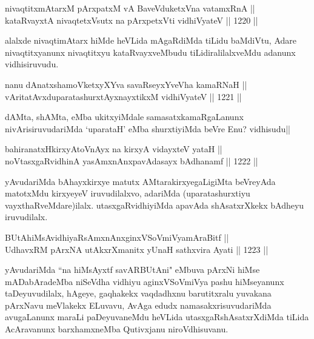\begin{shl}
nivaqtitxmAtarxM pArxpatxM vA BaveVduketxVna vatamxRnA || \\
kataRvayxtA nivaqtetxVsutx na pArxpetxVti vidhiVyateV ||  1220 ||  
\end{shl}

\begin{artha}
alalxde nivaqtimAtarx hiMde heVLida mAgaRdiMda tiLidu baMdiVtu, Adare nivaqtitxyanunx nivaqtitxyu kataRvayxveMbudu tiLidiralilalxveMdu adanunx vidhisiruvudu.
\end{artha}


\begin{shl}
nanu dAnatxshamoVketxyXYva savaRseyxYveVha kamaRNaH || \\
vAritatAvxduparatashurxtAyx\s nayxtikxM vidhiVyateV ||  1221 ||  
\end{shl}

\begin{artha}
dAMta, shAMta, eMba ukitxyiMdale samasatxkamaRgaLanunx nivArisiruvudariMda `uparataH' eMba shurxtiyiMda beVre Enu? vidhisudu||
\end{artha}

\begin{shl}
bahiranatxHkirxyAtoV\s nAyx na kirxyA vidayxteV yataH || \\
noVtasxgaRvidhinA yasAmxnAnxpavAdasayx bAdhanamf ||  1222 ||  
\end{shl}

\begin{artha}
yAvudariMda bAhayxkirxye matutx AMtarakirxyegaLigiMta beVreyAda matotxMdu kirxyeyeV iruvudilalxvo, adariMda (uparatashurxtiyu vayxthaRveMdare)ilalx. utasxgaRvidhiyiMda apavAda shAsatxrXkekx bAdheyu iruvudilalx.
\end{artha}


\begin{shl}
BUtAhiMsAvidhiyaRsAmxnAnxginxVSoVmiVyamAraBitf || \\
UdhavxRM pArxNA utAkxrXmanitx yUnaH sathxvira Ayati ||  1223 ||  
\end{shl}

\begin{artha}
yAvudariMda ``na hiMsAyxtf savARBUtAni" eMbuva pArxNi hiMse mADabAradeMba niSeVdha vidhiyu aginxVSoVmiVya pashu hiMseyanunx taDeyuvudilalx, hAgeye, gaqhakekx vaqdadhxnu barutitxralu yuvakana pArxNavu meVlakekx ELuvavu, AvAga edudx namasakxrisuvudariMda avugaLanunx maraLi paDeyuvaneMdu heVLida utasxgaRshAsatxrXdiMda tiLida AcAravanunx barxhamxneMba Qutivxjanu niroVdhisuvanu.
\end{artha}

